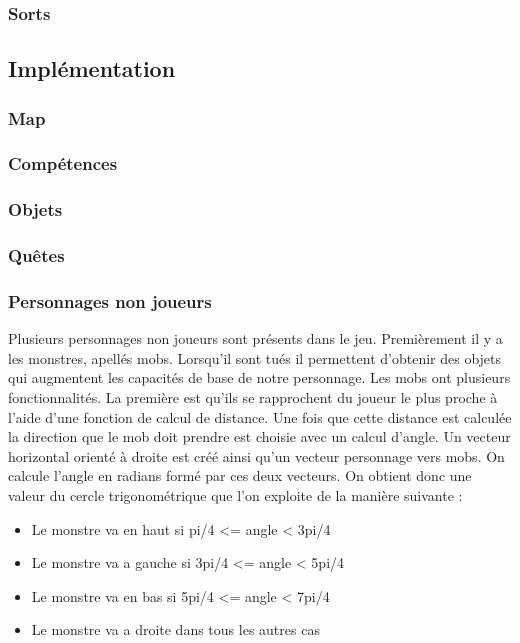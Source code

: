 \documentclass[11pt]{article}
\begin{document}
            \subsubsection{Sorts}
        \subsection{Implémentation}
            \subsubsection{Map}
            \subsubsection{Compétences}
            \subsubsection{Objets}
            \subsubsection{Quêtes}
            \subsubsection{Personnages non joueurs}
            Plusieurs personnages non joueurs sont présents dans le jeu. 
            Premièrement il y a les monstres, apellés mobs. Lorsqu'il sont tués il permettent d'obtenir des objets qui augmentent les capacités de base de notre personnage.
            Les mobs ont plusieurs fonctionnalités. La première est qu'ils se rapprochent du joueur le plus proche à l'aide d'une fonction de calcul de distance.
            Une fois que cette distance est calculée la direction que le mob doit prendre est choisie avec un calcul d'angle. 
            Un vecteur horizontal orienté à droite est créé ainsi qu'un vecteur personnage vers mobs. On calcule l'angle en radians formé par ces deux vecteurs.
            On obtient donc une valeur du cercle trigonométrique que l'on exploite de la manière suivante : 
            \begin{itemize}
                \item Le monstre va en haut si   pi/4 <= angle < 3pi/4
                \item Le monstre va a gauche si  3pi/4 <= angle < 5pi/4
                \item Le monstre va en bas si    5pi/4 <= angle < 7pi/4
                \item Le monstre va a droite dans tous les autres cas
            \end{itemize}
\end{document}
